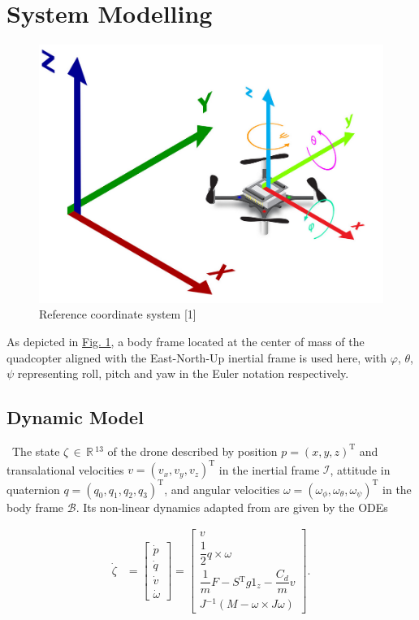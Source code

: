 \documentclass[conference]{IEEEtran}
\begin{document}
\section{System Modelling}\label{Section2}
\begin{figure}[htbp]
	\centerline{\includegraphics[scale = 0.4]{figures/ordinate.png} }
	\caption{Reference coordinate system [1]}
	\label{Fig1}
\end{figure}
As depicted in \hyperref[Fig1]{Fig. 1}, a body frame located at the center of mass of the quadcopter aligned with the East-North-Up inertial frame is used here, with $\varphi$, $\theta$, $\psi$ representing roll, pitch and yaw in the Euler notation respectively.

\subsection{Dynamic Model}\
The state ${\zeta\,\in\,\mathbb{R}\,\mathrm{^{13}}}$ of the drone described by position ${p = (x, y, z)^{\mathrm{T}}}$ and transalational velocities ${v = (v_x, v_y, v_z)^\mathrm{T}}$ in the inertial frame $\mathcal{I}$, attitude in quaternion ${q = (q_{0}, q_{1}, q_{2}, q_{3})^{\mathrm{T}}}$, and angular velocities ${\omega = (\omega_{\phi}, \omega_{\theta}, \omega_{\psi})^{\mathrm{T}}}$ in the body frame $\mathcal{B}$. Its non-linear dynamics adapted from \cite{carlos_efficient_2020} are given by the ODEs 

\begin{align}
\dot{\zeta} &= \begin{bmatrix}
	\dot{p} \\
	\dot{q}\\
	\dot{v}\\
	\dot{\omega}
\end{bmatrix} =
\begin{bmatrix}
    v \\
    \dfrac{1}{2}q\times \omega\\
    \dfrac{1}{m}F - S\mathrm{^{T}}g1_z - \dfrac{C_d}{m} v\\ 
    J\mathrm{^{-1}}\left(M - \omega \times J \omega\right)
\end{bmatrix}.
\end{align}
\end{document}
